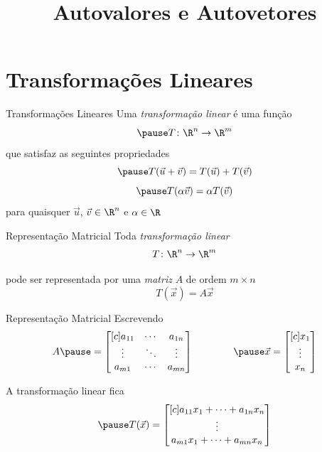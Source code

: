 \documentclass[fleqn,aspectratio=169,12pt]{beamer}
\title{Autovalores e Autovetores}
\begin{document}
\addtitle

\section{Transformações Lineares}

\begin{frame}{Transformações Lineares}
  Uma \emph{transformação linear} é uma função
  \[
    \pause
    T\colon \R^n \to \R^m
  \]
  \pause
  que satisfaz as seguintes propriedades
  \[
    \pause
    T(\vec{u}+\vec{v}) = T(\vec{u}) + T(\vec{v})
  \]
  \[
    \pause
    T(\alpha\vec{v})=\alpha T(\vec{v})
  \]
  \pause
  para quaisquer $\vec{u}$, $\vec{v}\in\R^n$ e $\alpha\in\R$
\end{frame}

\begin{frame}{Representação Matricial}
  Toda \emph{transformação linear}
  \[
    T\colon \R^n \to \R^m
  \]

  \pause
  \medskip
  pode ser representada por uma \emph{matriz} $A$
  \pause
  de ordem $m\times n$
  \pause
  \[
    T(\vec{x}) = A\vec{x}
  \]
\end{frame}

\begin{frame}{Representação Matricial}
  Escrevendo
  \[
    A
    \pause
    = \begin{bmatrix}[c]
      a_{11} & \cdots & a_{1n} \\
      \vdots & \ddots & \vdots \\
      a_{m1} & \cdots & a_{mn}
    \end{bmatrix}
    \qquad\qquad\pause
    \vec{x} =
    \begin{bmatrix}[c]
      x_1    \\
      \vdots \\
      x_n
    \end{bmatrix}
  \]

  \pause
  \medskip
  A transformação linear fica
  \[
    \pause
    T(\vec{x}) =
    \begin{bmatrix}[c]
      a_{11}x_1+\cdots+a_{1n}x_n \\
      \vdots                     \\
      a_{m1}x_1+\cdots+a_{mn}x_n
    \end{bmatrix}
  \]
\end{frame}
\end{document}
